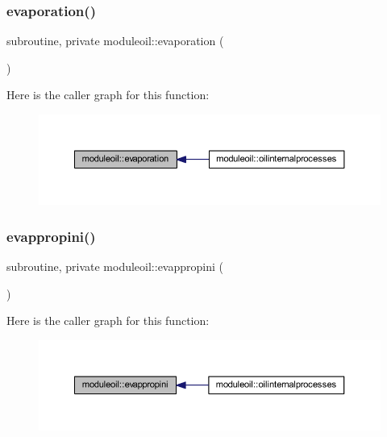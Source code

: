 \subsubsection{\texorpdfstring{evaporation()}{evaporation()}}
{\footnotesize\ttfamily subroutine, private moduleoil\+::evaporation (\begin{DoxyParamCaption}{ }\end{DoxyParamCaption})\hspace{0.3cm}{\ttfamily [private]}}

Here is the caller graph for this function\+:\nopagebreak
\begin{figure}[H]
\begin{center}
\leavevmode
\includegraphics[width=350pt]{namespacemoduleoil_a057ec48dbb4ce23ac0814ed1bdc90cc4_icgraph}
\end{center}
\end{figure}
\mbox{\label{namespacemoduleoil_accb31df9c42356be9b53b31d0d888b3b}} 
\subsubsection{\texorpdfstring{evappropini()}{evappropini()}}
{\footnotesize\ttfamily subroutine, private moduleoil\+::evappropini (\begin{DoxyParamCaption}{ }\end{DoxyParamCaption})\hspace{0.3cm}{\ttfamily [private]}}

Here is the caller graph for this function\+:\nopagebreak
\begin{figure}[H]
\begin{center}
\leavevmode
\includegraphics[width=350pt]{namespacemoduleoil_accb31df9c42356be9b53b31d0d888b3b_icgraph}
\end{center}
\end{figure}
\mbox{\label{namespacemoduleoil_af8b321b109edae35b2e3314b4cae8ee3}} 
